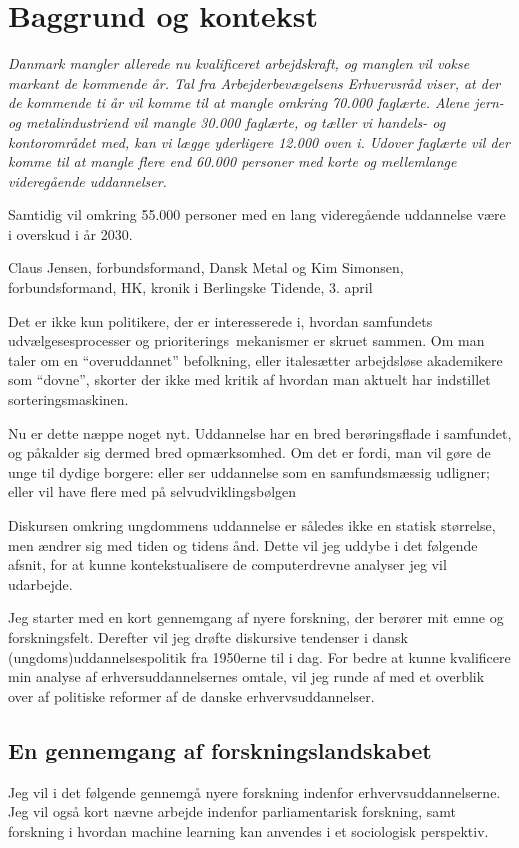\part{Baggrund og kontekst}\label{part:baggrund}
\epigraph{\itshape
Danmark mangler allerede nu kvalificeret arbejdskraft, og manglen vil vokse markant de kommende år. Tal fra Arbejderbevægelsens Erhvervsråd viser, at der de kommende ti år vil komme til at mangle omkring 70.000 faglærte. Alene jern- og metalindustriend vil mangle 30.000 faglærte, og tæller vi handels- og kontorområdet med, kan vi lægge yderligere 12.000 oven i. Udover faglærte vil der komme til at mangle flere end 60.000 personer med korte og mellemlange videregående uddannelser.

Samtidig vil omkring 55.000 personer med en lang videregående uddannelse være i overskud i år 2030.
}
{Claus Jensen, forbundsformand, Dansk Metal og Kim Simonsen, forbundsformand, HK, kronik i Berlingske Tidende, 3. april \citeyear{simonsenLadOsGore2016}}

Det er ikke kun politikere, der er interesserede i, hvordan samfundets udvælgesesprocesser og prioriterings\ mekanismer er skruet sammen.
Om man taler om en “overuddannet” befolkning, eller italesætter arbejdsløse akademikere som “dovne”, skorter der ikke med kritik af hvordan man aktuelt har indstillet sorteringsmaskinen.

Nu er dette næppe noget nyt.
Uddannelse har en bred berøringsflade i samfundet, og påkalder sig dermed bred opmærksomhed.
Om det er fordi, man vil gøre de unge til dydige borgere: eller ser uddannelse som en samfundsmæssig udligner; eller vil have flere med på selvudviklingsbølgen \cite{juulDiskurserOmUngdom2013} 

Diskursen omkring ungdommens uddannelse er således ikke en statisk størrelse, men ændrer sig med tiden og tidens ånd.
Dette vil jeg uddybe i det følgende afsnit, for at kunne kontekstualisere de computerdrevne analyser jeg vil udarbejde.

Jeg starter med en kort gennemgang af nyere forskning, der berører mit emne og forskningsfelt.
Derefter vil jeg drøfte diskursive tendenser i dansk (ungdoms)uddannelsespolitik fra 1950erne til i dag.
For bedre at kunne kvalificere min analyse af erhversuddannelsernes omtale, vil jeg runde af med et overblik over af politiske reformer af de danske erhvervsuddannelser.

\chapter{En gennemgang af forskningslandskabet}\label{sec:litreview}
Jeg vil i det følgende gennemgå nyere forskning indenfor erhvervsuddannelserne.
Jeg vil også kort nævne arbejde indenfor parliamentarisk forskning, samt forskning i hvordan machine learning kan anvendes i et sociologisk perspektiv.

